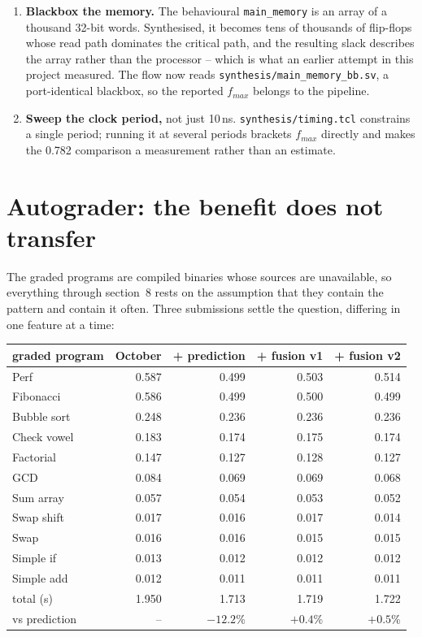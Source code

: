\documentclass[11pt]{article}
\begin{document}
\begin{enumerate}
\item \textbf{Blackbox the memory.} The behavioural \texttt{main\_memory} is an array of a
thousand 32-bit words. Synthesised, it becomes tens of thousands of flip-flops whose read
path dominates the critical path, and the resulting slack describes the array rather than
the processor -- which is what an earlier attempt in this project measured. The flow now
reads \texttt{synthesis/main\_memory\_bb.sv}, a port-identical blackbox, so the reported
$f_{max}$ belongs to the pipeline.
\item \textbf{Sweep the clock period,} not just 10\,ns. \texttt{synthesis/timing.tcl}
constrains a single period; running it at several periods brackets $f_{max}$ directly and
makes the 0.782 comparison a measurement rather than an estimate.
\end{enumerate}

\section{Autograder: the benefit does not transfer}

The graded programs are compiled binaries whose sources are unavailable, so everything
through section~8 rests on the assumption that they contain the pattern and contain it often.
Three submissions settle the question, differing in one feature at a time:

\begin{center}
\small
\begin{tabular}{lrrrr}
\toprule
graded program & October & + prediction & + fusion v1 & + fusion v2 \\
\midrule
Perf        & 0.587 & 0.499 & 0.503 & 0.514 \\
Fibonacci   & 0.586 & 0.499 & 0.500 & 0.499 \\
Bubble sort & 0.248 & 0.236 & 0.236 & 0.236 \\
Check vowel & 0.183 & 0.174 & 0.175 & 0.174 \\
Factorial   & 0.147 & 0.127 & 0.128 & 0.127 \\
GCD         & 0.084 & 0.069 & 0.069 & 0.068 \\
Sum array   & 0.057 & 0.054 & 0.053 & 0.052 \\
Swap shift  & 0.017 & 0.016 & 0.017 & 0.014 \\
Swap        & 0.016 & 0.016 & 0.015 & 0.015 \\
Simple if   & 0.013 & 0.012 & 0.012 & 0.012 \\
Simple add  & 0.012 & 0.011 & 0.011 & 0.011 \\
\midrule
total (s)   & 1.950 & 1.713 & 1.719 & 1.722 \\
vs prediction & -- & $-12.2$\% & $+0.4$\% & $+0.5$\% \\
\bottomrule
\end{tabular}
\end{center}
\end{document}
